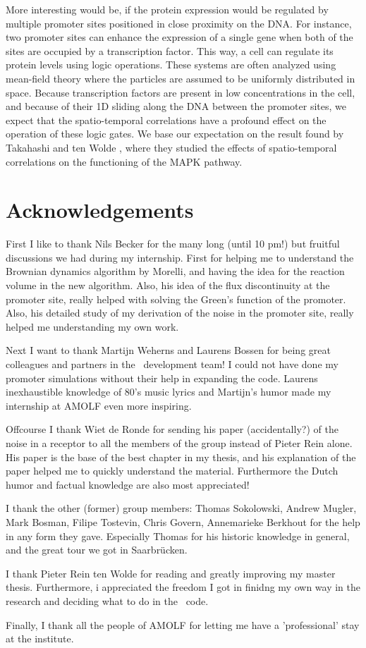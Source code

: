 More interesting would be, if the protein expression would be regulated by multiple promoter sites positioned in close proximity on the DNA. For instance, two promoter sites can enhance the expression of a single gene when both of the sites are occupied by a transcription factor. This way, a cell can regulate its protein levels using logic operations. These systems are often analyzed using mean-field theory where the particles are assumed to be uniformly distributed in space. Because transcription factors are present in low concentrations in the cell, and because of their 1D sliding along the DNA between the promoter sites, we expect that the spatio-temporal correlations have a profound effect on the operation of these logic gates. We base our expectation on the result found by Takahashi and ten Wolde \cite{Takahashi2010}, where they studied the effects of spatio-temporal correlations on the functioning of the MAPK pathway.

\newpage

\section{Acknowledgements}
First I like to thank Nils Becker for the many long (until 10 pm!) but fruitful discussions we had during my internship. First for helping me to understand the Brownian dynamics algorithm by Morelli, and having the idea for the reaction volume in the new algorithm. Also, his idea of the flux discontinuity at the promoter site, really helped with solving the Green's function of the promoter. Also, his detailed study of my derivation of the noise in the promoter site, really helped me understanding my own work. 

Next I want to thank Martijn Weherns and Laurens Bossen for being great colleagues and partners in the \GFRD\, development team! I could not have done my promoter simulations without their help in expanding the code. Laurens inexhaustible knowledge of 80's music lyrics and Martijn's humor made my internship at AMOLF  even more inspiring. 

Offcourse I thank Wiet de Ronde for sending his paper (accidentally?) of the noise in a receptor to all the members of the group instead of Pieter Rein alone. His paper is the base of the best chapter in my thesis, and his explanation of the paper helped me to quickly understand the material. Furthermore the Dutch humor and factual knowledge are also most appreciated!

I thank the other (former) group members: Thomas Sokolowski, Andrew Mugler, Mark Bosman, Filipe Tostevin, Chris Govern, Annemarieke Berkhout for the help in any form they gave. Especially Thomas for his historic knowledge in general, and the great tour we got in Saarbr\"ucken.

I thank Pieter Rein ten Wolde for reading and greatly improving my master thesis. Furthermore, i appreciated the freedom I got in finidng my own way in the research and deciding what to do in the \GFRD\, code.

Finally, I thank all the people of AMOLF for letting me have a 'professional' stay at the institute.